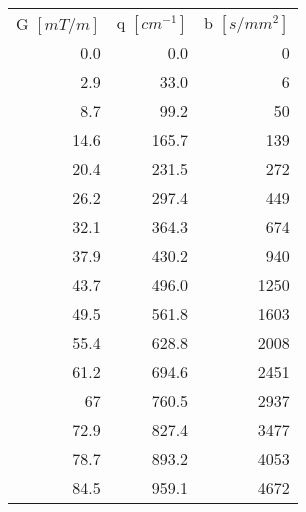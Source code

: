 \begin{table}[p]
\begin{tableframe}
{\begin{tabular}{rrr}
            \toprule
                G $[mT/m]$ & q $[cm^{-1}]$ & b $[s/mm^2]$ \\
                \cmidrule(r){1-1}\cmidrule(lr){2-2}\cmidrule(l){3-3}
                0.0  & 0.0  & 0 \\
                2.9  & 33.0  & 6 \\
                8.7  & 99.2  & 50 \\
                14.6  & 165.7 & 139 \\
                20.4  & 231.5 & 272 \\
                26.2  & 297.4 & 449 \\
                32.1  & 364.3 & 674 \\
                37.9  & 430.2 & 940 \\
                43.7  & 496.0 & 1250 \\
                49.5  & 561.8 & 1603 \\
                55.4  & 628.8 & 2008 \\
                61.2  & 694.6 & 2451 \\
                67    & 760.5 & 2937 \\
                72.9  & 827.4 & 3477 \\
                78.7  & 893.2 & 4053 \\
                84.5  & 959.1 & 4672 \\
                \bottomrule
            \end{tabular}%
     }\\[1cm]
\end{tableframe}
\end{table}
